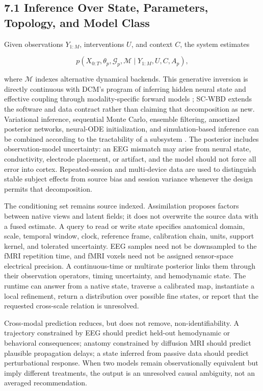 \subsection{7.1 Inference Over State, Parameters, Topology, and Model Class}

Given observations \(Y_{1:M}\), interventions \(U\), and context \(C\), the
system estimates

\[
p\!\left(
X_{0:T},\theta_p,\mathcal{G}_p,\mathcal{M}
\mid Y_{1:M},U,C,A_p
\right),
\]

where \(\mathcal{M}\) indexes alternative dynamical backends. This generative
inversion is directly continuous with DCM's program of inferring hidden neural
state and effective coupling through modality-specific forward models
\citep{friston2003dcm}; SC-WBD extends the software and data contract rather
than claiming that decomposition as new. Variational
inference, sequential Monte Carlo, ensemble filtering, amortized posterior
networks, neural-ODE initialization, and simulation-based inference can be
combined according to the tractability of a subsystem
\citep{kashyap2023}. The posterior includes observation-model uncertainty:
an EEG mismatch may arise from neural state, conductivity, electrode
placement, or artifact, and the model should not force all error into cortex.
Repeated-session and multi-device data are used to distinguish stable subject
effects from source bias and session variance whenever the design permits that
decomposition.

The conditioning set remains source indexed. Assimilation proposes factors
between native views and latent fields; it does not overwrite the source data
with a fused estimate. A query to read or write state specifies anatomical
domain, scale, temporal window, clock, reference frame, calibration chain,
units, support kernel, and tolerated uncertainty. EEG samples need not be
downsampled to the fMRI repetition time, and fMRI voxels need not be assigned
sensor-space electrical precision. A continuous-time or multirate posterior
links them through their observation operators, timing uncertainty, and
hemodynamic state. The runtime can answer from a native state, traverse a
calibrated map, instantiate a local refinement, return a distribution over
possible fine states, or report that the requested cross-scale relation is
unresolved.

Cross-modal prediction reduces, but does not remove, non-identifiability. A
trajectory constrained by EEG should predict held-out hemodynamic or
behavioral consequences; anatomy constrained by diffusion MRI should predict
plausible propagation delays; a state inferred from passive data should
predict perturbational response. When two models remain observationally
equivalent but imply different treatments, the output is an unresolved causal
ambiguity, not an averaged recommendation.

